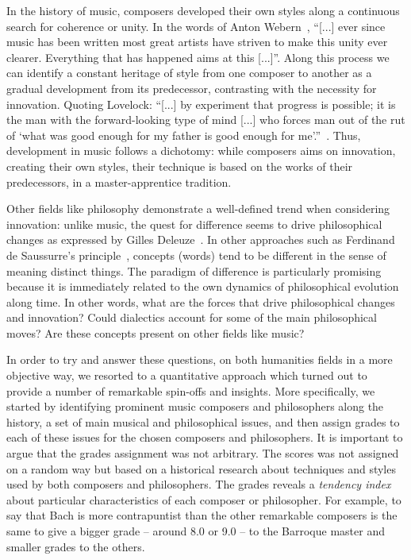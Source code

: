 \documentclass[
 aip,
 jmp,
 amsmath,amssymb,
 reprint,
]{revtex4-1}
\begin{document}
In the history of music, composers developed their own styles along a
continuous search for coherence or unity. In the words of Anton
Webern~\cite{Webern}, ``[...] ever since music has been written most great artists
have striven to make this unity ever clearer. Everything that has
happened aims at this [...]''. Along this process we can identify
a constant heritage of style from one composer to another as
a gradual development from its
predecessor, contrasting with the necessity for innovation. Quoting
Lovelock: 
``[...] by experiment that progress is possible; it is the man
with the forward-looking type of mind [...] who forces man out of the
rut of `what was good enough for my father is good enough for me'.''~\cite{Lovelock}.
Thus, development in music follows a dichotomy: while composers aims on
innovation, creating their own styles, their technique is based on the
works of their predecessors, in a master-apprentice tradition.

Other fields like philosophy demonstrate
a well-defined trend when considering innovation: unlike music, the
quest for difference seems to drive philosophical
changes as expressed by Gilles Deleuze~\cite{Deleuze}. In other approaches such as Ferdinand de
Saussurre's principle~\cite{Saussure}, concepts (words) tend
to be different in the sense of meaning distinct things.  The paradigm
of difference is particularly promising because it is immediately
related to the own dynamics of philosophical evolution along time.  In
other words, what are the forces that drive philosophical changes and
innovation?  Could dialectics account for some of the main
philosophical moves? Are these concepts present on other fields like music?

In order to try and answer these questions, on both humanities fields in a more objective way, we resorted to a quantitative approach which turned out to provide a number of remarkable spin-offs and insights. More specifically, we
started by identifying prominent music composers and philosophers along the history, a set of main musical and philosophical issues, and then
assign grades to each of these issues for the chosen composers and philosophers. It is important to argue that the grades assignment was not arbitrary. The scores was not assigned on a random way but based on a historical research about techniques and styles used by both composers and philosophers. The grades reveals a \emph{tendency index} about particular characteristics of each composer or philosopher. For example, to say that Bach is more contrapuntist than the other remarkable composers is the same to give a bigger grade -- around 8.0 or 9.0 -- to the Barroque master and smaller grades to the others.
\end{document}
